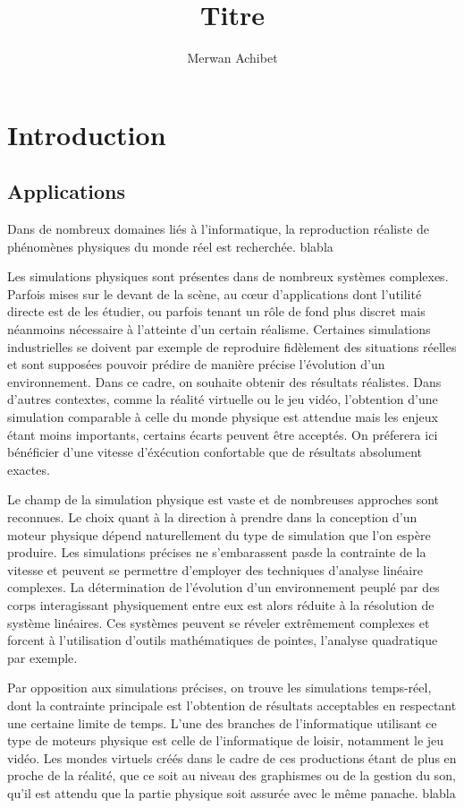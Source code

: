 \documentclass[twocolumn]{article}
\title{Titre}
\author{Merwan Achibet}
\date{}
\begin{document}
\maketitle

\section{Introduction}

\subsection{Applications}

Dans de nombreux domaines liés à l'informatique, la reproduction réaliste de phénomènes physiques du monde réel est recherchée. blabla

Les simulations physiques sont présentes dans de nombreux systèmes complexes. Parfois mises sur le devant de la scène, au c\oe ur d'applications dont l'utilité directe est de les étudier, ou parfois tenant un rôle de fond plus discret mais néanmoins nécessaire à l'atteinte d'un certain réalisme. Certaines simulations industrielles se doivent par exemple de reproduire fidèlement des situations réelles et sont supposées pouvoir prédire de manière précise l'évolution d'un environnement. Dans ce cadre, on souhaite obtenir des résultats réalistes. Dans d'autres contextes, comme la réalité virtuelle ou le jeu vidéo, l'obtention d'une simulation comparable à celle du monde physique est attendue mais les enjeux étant moins importants, certains écarts peuvent être acceptés. On préferera ici bénéficier d'une vitesse d'éxécution confortable que de résultats absolument exactes.

Le champ de la simulation physique est vaste et de nombreuses approches sont reconnues. Le choix quant à la direction à prendre dans la conception d'un moteur physique dépend naturellement du type de simulation que l'on espère produire. Les simulations précises ne s'embarassent pasde la contrainte de la vitesse et peuvent se permettre d'employer des techniques d'analyse linéaire complexes. La détermination de l'évolution d'un environnement peuplé par des corps interagissant physiquement entre eux est alors réduite à la résolution de système linéaires. Ces systèmes peuvent se réveler extrêmement complexes et forcent à l'utilisation d'outils mathématiques de pointes, l'analyse quadratique par exemple.

Par opposition aux simulations précises, on trouve les simulations temps-réel, dont la contrainte principale est l'obtention de résultats acceptables en respectant une certaine limite de temps. L'une des branches de l'informatique utilisant ce type de moteurs physique est celle de l'informatique de loisir, notamment le jeu vidéo. Les mondes virtuels créés dans le cadre de ces productions étant de plus en proche de la réalité, que ce soit au niveau des graphismes ou de la gestion du son, qu'il est attendu que la partie physique soit assurée avec le même panache. blabla
\end{document}
